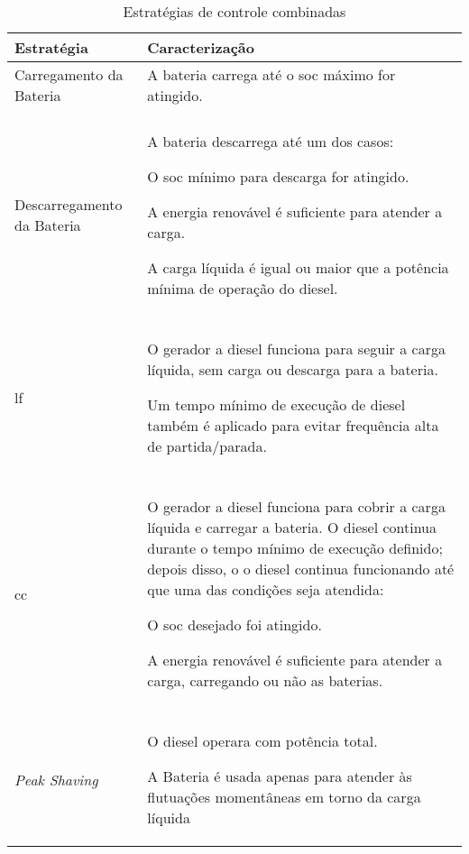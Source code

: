 
\begin{table}[ht]
	\centering

    \begin{tabular}{l p{10cm}}
		\hline
		Estratégia    &   Caracterização \\
		\hline
		\hline
        Carregamento da Bateria &
        A bateria carrega até o \acrshort{soc} máximo for atingido.
        \\
        \\
        Descarregamento da Bateria &
        A bateria descarrega até um dos casos:

        O \acrshort{soc} mínimo para descarga for atingido.

        A energia renovável é suficiente para atender a carga.

        A carga líquida é igual ou maior que a potência mínima de operação do diesel.
        \\
        \\
        \acrlong{lf} &
        O gerador a diesel funciona para seguir a carga líquida, sem carga ou descarga para a bateria.

        Um tempo mínimo de execução de diesel também é aplicado para evitar frequência alta de partida/parada.
        \\
        \\
        \acrlong{cc} &
        O gerador a diesel funciona para cobrir a carga líquida e carregar a bateria. O diesel continua durante o tempo mínimo de execução definido; depois disso, o o diesel continua funcionando até que uma das condições seja atendida:

        O \acrshort{soc} desejado foi atingido.

        A energia renovável é suficiente para atender a carga, carregando ou não
        as baterias.
        \\
        \\
        \emph{Peak Shaving} &
        O diesel operara com potência total.

        A Bateria é usada apenas para atender às flutuações momentâneas em torno da carga líquida \\
        \hline
	\end{tabular}

	\caption{Estratégias de controle combinadas}\label{tbl:dispatch}
\end{table}
